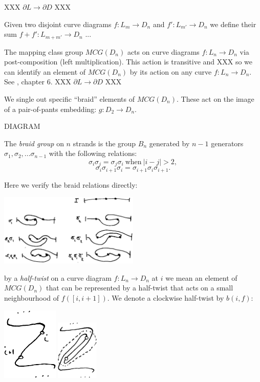 \documentclass[12pt,a4paper]{article}
\begin{document}
XXX $\partial L\to \partial D$ XXX

Given two disjoint curve diagrams $f:L_m\to D_n$ and $f':L_{m'}\to D_n$
we define their sum  $f+f':L_{m+m'}\to D_n$ ...



The mapping class group $MCG(D_n)$ acts on curve diagrams $f : L_n\to D_n$
via post-composition (left multiplication).
This action is transitive and XXX so we can identify an element of
$MCG(D_n)$ by its action on any curve $f:L_n\to D_n.$
See \cite{Dehornoy02}, chapter 6.
XXX $\partial L\to \partial D$ XXX



We single out specific ``braid'' elements of $MCG(D_n)$.
These act on the image of a pair-of-pants embedding: $g:D_2\to D_n.$

DIAGRAM

The {\it braid group} on $n$ strands is the group $B_n$ generated by $n-1$ generators
$\sigma_1, \sigma_2, ... \sigma_{n-1}$ with the following relations:
    $$ \sigma_i \sigma_j = \sigma_j \sigma_i \ \text{when}\ |i-j| > 2, $$
    $$ \sigma_i \sigma_{i+1} \sigma_i =  \sigma_{i+1} \sigma_i \sigma_{i+1}.$$


Here we verify the braid relations directly:

\begin{center}
\includegraphics[width=0.5\textwidth]{curve-braid.eps}
\end{center}


 by a {\it half-twist} on a curve
diagram $f:L_n\to D_n$ at $i$ we mean an element of $MCG(D_n)$
that can be represented by a half-twist that acts
on a small neighbourhood of $f([i, i+1]).$
We denote a clockwise half-twist by $b(i, f):$

\begin{center}
\includegraphics[width=0.2\textwidth]{halftwist-1.eps}
\includegraphics[width=0.15\textwidth]{halftwist-2.eps}
\end{center}
\end{document}

